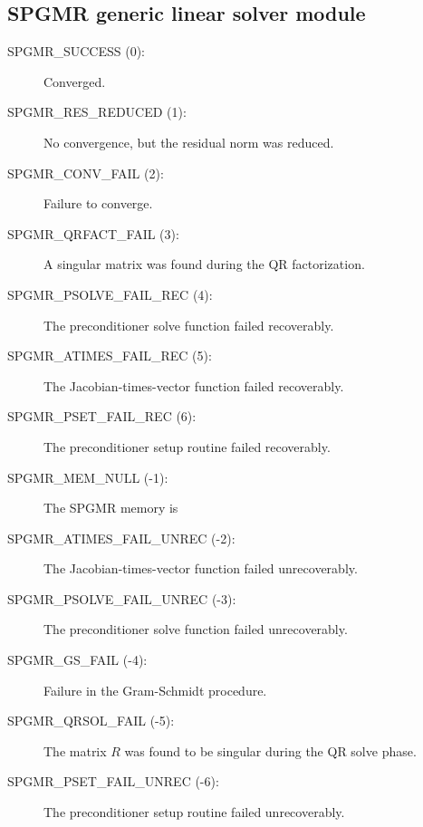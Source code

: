 \documentclass[letterpaper,10pt,english]{sphinxmanual}
\begin{document}
\subsection{SPGMR generic linear solver module}
\label{Constants:spgmr-generic-linear-solver-module}\begin{description}
\item[{SPGMR\_SUCCESS  (0):}] \leavevmode
Converged.

\item[{SPGMR\_RES\_REDUCED  (1):}] \leavevmode
No convergence, but the residual norm was
reduced.

\item[{SPGMR\_CONV\_FAIL  (2):}] \leavevmode
Failure to converge.

\item[{SPGMR\_QRFACT\_FAIL  (3):}] \leavevmode
A singular matrix was found during the
QR factorization.

\item[{SPGMR\_PSOLVE\_FAIL\_REC  (4):}] \leavevmode
The preconditioner solve function
failed recoverably.

\item[{SPGMR\_ATIMES\_FAIL\_REC  (5):}] \leavevmode
The Jacobian-times-vector function
failed recoverably.

\item[{SPGMR\_PSET\_FAIL\_REC  (6):}] \leavevmode
The preconditioner setup routine failed
recoverably.

\item[{SPGMR\_MEM\_NULL  (-1):}] \leavevmode
The SPGMR memory is 

\item[{SPGMR\_ATIMES\_FAIL\_UNREC  (-2):}] \leavevmode
The Jacobian-times-vector function
failed unrecoverably.

\item[{SPGMR\_PSOLVE\_FAIL\_UNREC  (-3):}] \leavevmode
The preconditioner solve function
failed unrecoverably.

\item[{SPGMR\_GS\_FAIL  (-4):}] \leavevmode
Failure in the Gram-Schmidt procedure.

\item[{SPGMR\_QRSOL\_FAIL  (-5):}] \leavevmode
The matrix \(R\) was found to be
singular during the QR solve phase.

\item[{SPGMR\_PSET\_FAIL\_UNREC  (-6):}] \leavevmode
The preconditioner setup routine
failed unrecoverably.

\end{description}
\end{document}
